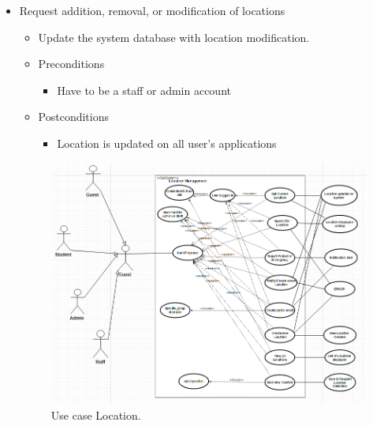 \documentclass[12pt]{article}
\begin{document}
\begin{enumerate}
\begin{itemize}
				\item Request addition, removal, or modification of locations
				\begin{itemize}
					\item Update the system database with location modification. 
					\item Preconditions
					\begin{itemize}
						\item Have to be a staff or admin account
					\end{itemize}
					\item Postconditions
					\begin{itemize}
						\item Location is updated on all user’s applications
					\end{itemize}
				\end{itemize}
				\begin{figure}
                     \includegraphics[width=\linewidth]{useCaseLocation.png}
                     \caption{Use case Location.}
  \label{fig:location1}
			    \end{figure}
			\end{itemize}
			

\end{enumerate}
\end{document}
